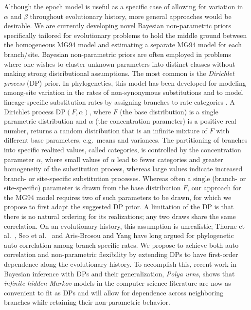 Although the epoch model is useful as a specific case of allowing for variation in $\alpha$ and $\beta$ throughout evolutionary history, more general approaches would be desirable.
We are currently developing novel Bayesian non-parametric priors specifically tailored for evolutionary problems to hold the middle ground between the homogeneous MG94 model and estimating a separate MG94 model for each branch/site.
Bayesian non-parametric priors are often employed in problems where one wishes to cluster unknown parameters into distinct classes without making strong distributional assumptions.
The most common is the \emph{Dirichlet process} (DP) prior. 
In phylogenetics, this model has been developed for modeling among-site variation in the rates of non-synonymous substitutions \citep{Huelsenbeck2006} and to model lineage-specific substitution rates by assigning branches to rate categories \citep{Heath2012}.
A Dirichlet process DP$(F, \alpha)$, where $F$ (the base distribution) is a single parametric distribution and $\alpha$ (the concentration parameter) is a positive real number, returns a random distribution that is an infinite mixture of $F$ with different base parameters, e.g.~means and variances.
The partitioning of branches into specific realized values, called categories, is controlled by the concentration parameter $\alpha$, where small values of $\alpha$ lead to fewer categories and greater homogeneity of the substitution process, whereas large values indicate increased branch- or site-specific substitution processes.
Whereas often a single (branch- or site-specific) parameter is drawn from the base distribution $F$, our approach for the MG94 model requires two of such parameters to be drawn, for which we propose to first adapt the suggested DP prior.
A limitation of the DP is that there is no natural ordering for its realizations; any two draws share the same correlation.  
On an evolutionary history, this assumption is unrealistic; Thorne et al.~\citep{Thorne1998}, Seo et al.~\citep{SKT04} and Aris-Brosou and Yang \citep{Aris-Brosou2002} have long argued for phylogenetic auto-correlation among branch-specific rates.
We propose to achieve both auto-correlation and non-parametric flexibility by extending DPs to have first-order dependence along the evolutionary history.  
To accomplish this, recent work in Bayesian inference with DPs and their generalization, \emph{Polya urns}, \citep{Guha2010} shows that \emph{infinite hidden Markov} models \citep{Beal2002} in the computer science literature are now as convenient to fit as DPs and will allow for dependence across neighboring branches while retaining their non-parametric behavior.

